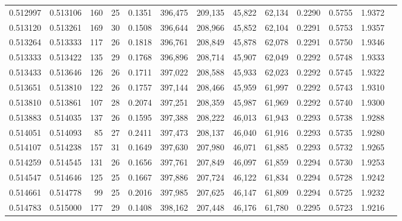 \begin{tabular}{rrrrrrrrrrrrr}
0.512997 & 0.513106 &    160 &    25 &                                     0.1351 & 396,475 & 209,135 &  45,822 &  62,134 & 0.2290 & 0.5755 & 1.9372 \\
0.513120 & 0.513261 &    169 &    30 &                                     0.1508 & 396,644 & 208,966 &  45,852 &  62,104 & 0.2291 & 0.5753 & 1.9357 \\
0.513264 & 0.513333 &    117 &    26 &                                     0.1818 & 396,761 & 208,849 &  45,878 &  62,078 & 0.2291 & 0.5750 & 1.9346 \\
0.513333 & 0.513422 &    135 &    29 &                                     0.1768 & 396,896 & 208,714 &  45,907 &  62,049 & 0.2292 & 0.5748 & 1.9333 \\
0.513433 & 0.513646 &    126 &    26 &                                     0.1711 & 397,022 & 208,588 &  45,933 &  62,023 & 0.2292 & 0.5745 & 1.9322 \\
0.513651 & 0.513810 &    122 &    26 &                                     0.1757 & 397,144 & 208,466 &  45,959 &  61,997 & 0.2292 & 0.5743 & 1.9310 \\
0.513810 & 0.513861 &    107 &    28 &                                     0.2074 & 397,251 & 208,359 &  45,987 &  61,969 & 0.2292 & 0.5740 & 1.9300 \\
0.513883 & 0.514035 &    137 &    26 &                                     0.1595 & 397,388 & 208,222 &  46,013 &  61,943 & 0.2293 & 0.5738 & 1.9288 \\
0.514051 & 0.514093 &     85 &    27 &                                     0.2411 & 397,473 & 208,137 &  46,040 &  61,916 & 0.2293 & 0.5735 & 1.9280 \\
0.514107 & 0.514238 &    157 &    31 &                                     0.1649 & 397,630 & 207,980 &  46,071 &  61,885 & 0.2293 & 0.5732 & 1.9265 \\
0.514259 & 0.514545 &    131 &    26 &                                     0.1656 & 397,761 & 207,849 &  46,097 &  61,859 & 0.2294 & 0.5730 & 1.9253 \\
0.514547 & 0.514646 &    125 &    25 &                                     0.1667 & 397,886 & 207,724 &  46,122 &  61,834 & 0.2294 & 0.5728 & 1.9242 \\
0.514661 & 0.514778 &     99 &    25 &                                     0.2016 & 397,985 & 207,625 &  46,147 &  61,809 & 0.2294 & 0.5725 & 1.9232 \\
0.514783 & 0.515000 &    177 &    29 &                                     0.1408 & 398,162 & 207,448 &  46,176 &  61,780 & 0.2295 & 0.5723 & 1.9216 \\

\end{tabular}
